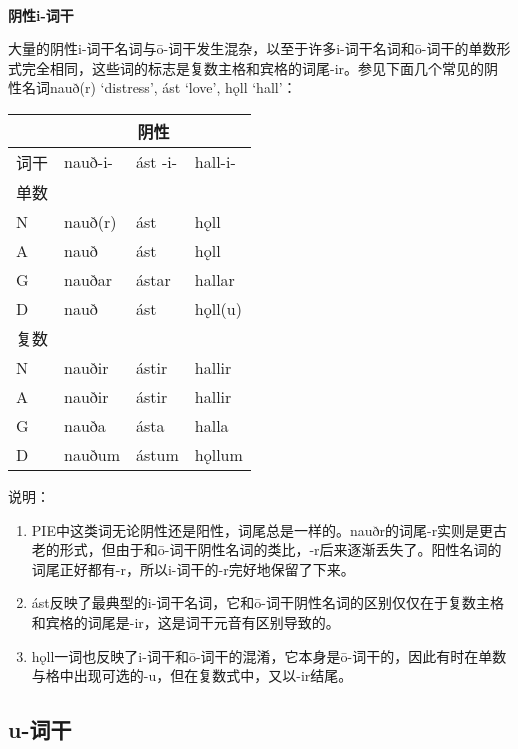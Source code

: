 ~\\
\textbf{阴性i-词干}

大量的阴性i-词干名词与ō-词干发生混杂，以至于许多i-词干名词和ō-词干的单数形式完全相同，这些词的标志是复数主格和宾格的词尾-ir。参见下面几个常见的阴性名词nauð(r)
`distress', ást `love', hǫll `hall'：

\begin{longtable}{llll}
  \toprule
       & \multicolumn{3}{c}{\textbf{阴性}}                     \\
  \midrule
  \endhead
  \bottomrule
  \endfoot
  词干 & nauð-i-                  & ást -i- & hall-i- \\
  单数 &                          &         &         \\
  N    & nauð(r)                  & ást     & hǫll    \\
  A    & nauð                     & ást     & hǫll    \\
  G    & nauðar                   & ástar   & hallar  \\
  D    & nauð                     & ást     & hǫll(u) \\
  复数 &                          &         &         \\
  N    & nauðir                   & ástir   & hallir  \\
  A    & nauðir                   & ástir   & hallir  \\
  G    & nauða                    & ásta    & halla   \\
  D    & nauðum                   & ástum   & hǫllum  \\
\end{longtable}

说明：

\begin{enumerate}[1)]
  \item
        PIE中这类词无论阴性还是阳性，词尾总是一样的。nauðr的词尾-r实则是更古老的形式，但由于和ō-词干阴性名词的类比，-r后来逐渐丢失了。阳性名词的词尾正好都有-r，所以i-词干的-r完好地保留了下来。
  \item
        ást反映了最典型的i-词干名词，它和ō-词干阴性名词的区别仅仅在于复数主格和宾格的词尾是-ir，这是词干元音有区别导致的。
  \item
        hǫll一词也反映了i-词干和ō-词干的混淆，它本身是ō-词干的，因此有时在单数与格中出现可选的-u，但在复数式中，又以-ir结尾。
\end{enumerate}

\subsection{u-词干}
\label{u-词干}

